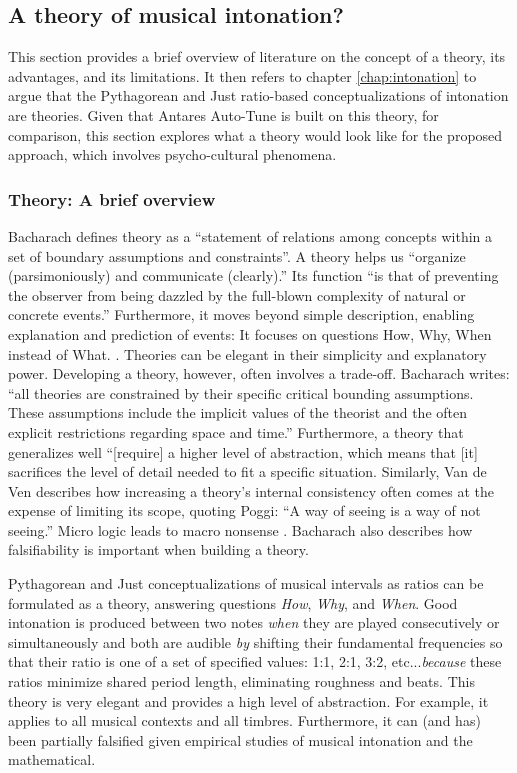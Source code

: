 \subsection{A theory of musical intonation?}
This section provides a brief overview of literature on the concept of a theory, its advantages, and its limitations. It then refers to chapter \ref{chap:intonation} to argue that the Pythagorean and Just ratio-based conceptualizations of intonation are theories. Given that Antares Auto-Tune is built on this theory, for comparison, this section explores what a theory would look like for the proposed approach, which involves psycho-cultural phenomena. 

\subsubsection{Theory: A brief overview}
\label{sec:theory}
Bacharach defines theory as a ``statement of relations among concepts within a set of boundary assumptions and constraints''. A theory helps us ``organize (parsimoniously) and communicate (clearly).'' \cite{bacharach1989organizational} Its function ``is that of preventing the observer from being dazzled by the full-blown complexity of natural or concrete events.'' \cite{hall1957theories} Furthermore, it moves beyond simple description, enabling explanation and prediction of events: It focuses on questions How, Why, When instead of What. \cite{bacharach1989organizational}. Theories can be elegant in their simplicity and explanatory power. Developing a theory, however, often involves a trade-off. Bacharach writes: ``all theories are constrained by their specific critical bounding assumptions. These assumptions include the implicit values of the theorist and the often explicit restrictions regarding space and time.'' Furthermore, a theory that generalizes well ``[require] a higher level of abstraction, which means that [it] sacrifices the level of detail needed to fit a specific situation. Similarly, Van de Ven describes how increasing a theory's internal consistency often comes at the expense of limiting its scope, quoting Poggi: ``A way of seeing is a way of not seeing.'' \cite{poggi1965main} Micro logic leads to macro nonsense \cite{van1989nothing}. Bacharach also describes how falsifiability is important when building a theory. 

Pythagorean and Just conceptualizations of musical intervals as ratios can be formulated as a theory, answering questions \textit{How}, \textit{Why}, and \textit{When}. Good intonation is produced between two notes \textit{when} they are played consecutively or simultaneously and both are audible \textit{by} shifting their fundamental frequencies so that their ratio is one of a set of specified values: 1:1, 2:1, 3:2, etc...\textit{because} these ratios minimize shared period length, eliminating roughness and beats. This theory is very elegant and provides a high level of abstraction. For example, it applies to all musical contexts and all timbres. Furthermore, it can (and has) been partially falsified given empirical studies of musical intonation and the mathematical. 

